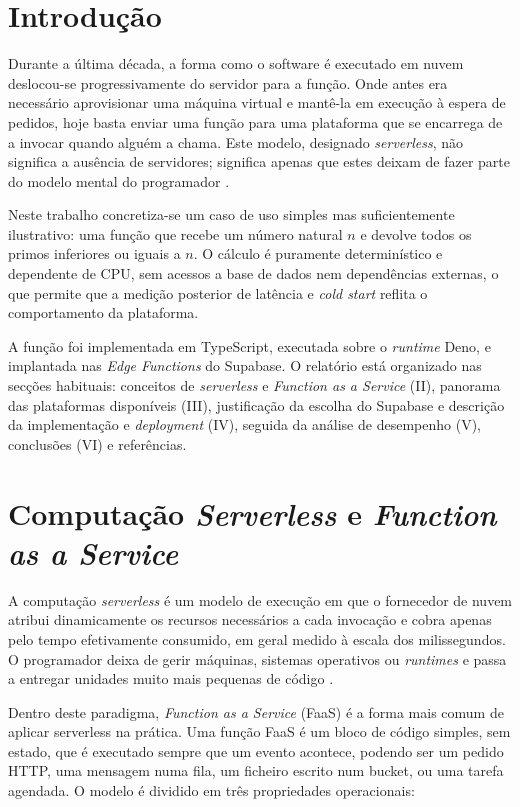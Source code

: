 \documentclass[conference]{IEEEtran}
\begin{document}
\section{Introdução}
Durante a última década, a forma como o software é executado em nuvem deslocou-se progressivamente do servidor para a função. Onde antes era necessário aprovisionar uma máquina virtual e mantê-la em execução à espera de pedidos, hoje basta enviar uma função para uma plataforma que se encarrega de a invocar quando alguém a chama. Este modelo, designado \textit{serverless}, não significa a ausência de servidores; significa apenas que estes deixam de fazer parte do modelo mental do programador \cite{baldini2017,castro2019}.

Neste trabalho concretiza-se um caso de uso simples mas suficientemente ilustrativo: uma função que recebe um número natural $n$ e devolve todos os primos inferiores ou iguais a $n$. O cálculo é puramente determinístico e dependente de CPU, sem acessos a base de dados nem dependências externas, o que permite que a medição posterior de latência e \textit{cold start} reflita o comportamento da plataforma.

A função foi implementada em TypeScript, executada sobre o \textit{runtime} Deno, e implantada nas \textit{Edge Functions} do Supabase. O relatório está organizado nas secções habituais: conceitos de \textit{serverless} e \textit{Function as a Service} (II), panorama das plataformas disponíveis (III), justificação da escolha do Supabase e descrição da implementação e \textit{deployment} (IV), seguida da análise de desempenho (V), conclusões (VI) e referências.

\section{Computação \textit{Serverless} e \textit{Function as a Service}}
A computação \textit{serverless} é um modelo de execução em que o fornecedor de nuvem atribui dinamicamente os recursos necessários a cada invocação e cobra apenas pelo tempo efetivamente consumido, em geral medido à escala dos milissegundos. O programador deixa de gerir máquinas, sistemas operativos ou \textit{runtimes} e passa a entregar unidades muito mais pequenas de código \cite{baldini2017,jonas2019}.

Dentro deste paradigma, \textit{Function as a Service} (FaaS) é a forma mais comum de aplicar serverless na prática. Uma função FaaS é um bloco de código simples, sem estado, que é executado sempre que um evento acontece, podendo ser um pedido HTTP, uma mensagem numa fila, um ficheiro escrito num bucket, ou uma tarefa agendada. O modelo é dividido em três propriedades operacionais:
\end{document}
